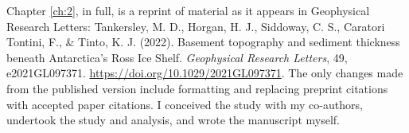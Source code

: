 Chapter \ref{ch:2}, in full, is a reprint of material as it appears in Geophysical Research Letters: 
Tankersley, M. D., Horgan, H. J., Siddoway, C. S., Caratori Tontini, F., \& Tinto, K. J. (2022). Basement topography and sediment thickness beneath Antarctica's Ross Ice Shelf. \textit{ Geophysical Research Letters}, 49, e2021GL097371. \url{https://doi.org/10.1029/2021GL097371}. The only changes made from the published version include formatting and replacing preprint citations with accepted paper citations. I conceived the study with my co-authors, undertook the study and analysis, and wrote the manuscript myself.